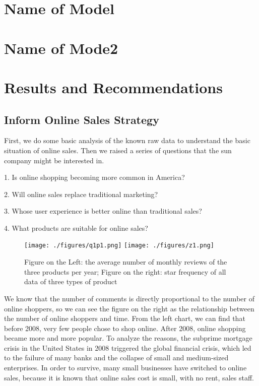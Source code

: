 \documentclass{mcmthesis}
\begin{document}
\section{Name of Model}



\section{Name of Mode2}




\section{ Results and Recommendations}
\subsection{Inform Online Sales Strategy}
First, we do some basic analysis of the known raw data to understand the basic situation of online sales. Then we raised a series of questions that the sun company might be interested in.

1. Is online shopping becoming more common in America?

2. Will online sales replace traditional marketing?

3. Whose user experience is better online than traditional sales?

4. What products are suitable for online sales?

\begin{figure}[H]
	\texttt{[image: ./figures/q1p1.png]}
	\texttt{[image: ./figures/z1.png]}
	\caption{Figure on the Left: the average number of monthly reviews of the three products per year; Figure on the right: star frequency of all data of three types of product} \label{z1_q1p1}
\end{figure}

We know that the number of comments is directly proportional to the number of online shoppers, so we can see the figure on the right as the relationship between the number of online shoppers and time. From the left chart, we can find that before 2008, very few people chose to shop online. After 2008, online shopping became more and more popular. To analyze the reasons, the subprime mortgage crisis in the United States in 2008 triggered the global financial crisis, which led to the failure of many banks and the collapse of small and medium-sized enterprises. In order to survive, many small businesses have switched to online sales, because it is known that online sales cost is small, with no rent, sales staff.
\end{document}
